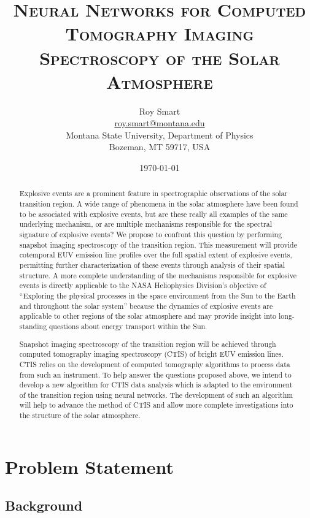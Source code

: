 \documentclass[10pt, letter]{article}
\title{\textsc{Neural Networks for Computed Tomography Imaging Spectroscopy of the Solar Atmosphere}}
\date{\today}
\author{Roy Smart \\ \url{roy.smart@montana.edu} \\ Montana State University, Department of Physics \\ Bozeman, MT 59717, USA}
\begin{document}
	\maketitle
	
	\begin{abstract}
		
		Explosive events are a prominent feature in spectrographic observations of the solar transition region. A wide range of phenomena in the solar atmosphere have been found to be associated with explosive events, but are these really all examples of the same underlying mechanism, or are multiple mechanisms responsible for the spectral signature of explosive events? We propose to confront this question by performing snapshot imaging spectroscopy of the transition region. This measurement will provide cotemporal EUV emission line profiles over the full spatial extent of explosive events, permitting further characterization of these events through analysis of their spatial structure. A more complete understanding of the mechanisms responsible for explosive events is directly applicable to the NASA Heliophysics Division's objective of ``Exploring the physical processes in the space environment from the Sun to the Earth and throughout the solar system'' because the dynamics of explosive events are applicable to other regions of the solar atmosphere and may provide insight into long-standing questions about energy transport within the Sun.
		
		Snapshot imaging spectroscopy of the transition region will be achieved through computed tomography imaging spectroscopy (CTIS) of bright EUV emission lines. CTIS relies on the development of computed tomography algorithms to process data from such an instrument. To help answer the questions proposed above, we intend to develop a new algorithm for CTIS data analysis which is adapted to the environment of the transition region using neural networks. The development of such an algorithm will help to advance the method of CTIS and allow more complete investigations into the structure of the solar atmosphere.

		
	\end{abstract}
	
	\section{Problem Statement}	
	
		\subsection{Background} \label{back_sec} 
		
\end{document}
